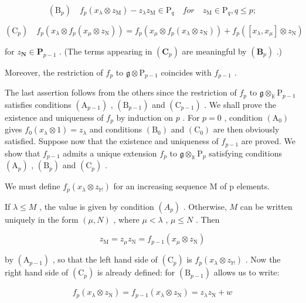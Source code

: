 \[
\left(\mathrm{B} _ {p}\right) \quad f _ {p} \left(x _ {\lambda} \otimes z _ {\mathrm{M}}\right) - z _ {\lambda} z _ {\mathrm{M}} \in \mathrm{P} _ {q} \quad for \quad z _ {\mathrm{M}} \in \mathrm{P} _ {q}, q \leqslant p;
\]

\[
\left(\mathrm{C} _ {p}\right) \quad f _ {p} \left(x _ {\lambda} \otimes f _ {p} \left(x _ {\mu} \otimes z _ {\mathrm{N}}\right)\right) = f _ {p} \left(x _ {\mu} \otimes f _ {p} \left(x _ {\lambda} \otimes z _ {\mathrm{N}}\right)\right) + f _ {p} \left(\left[ x _ {\lambda}, x _ {\mu} \right] \otimes z _ {\mathrm{N}}\right)
\]

for \(z_{\mathbf{N}} \in \mathbf{P}_{p-1}\) . (The terms appearing in \((\mathbf{C}_p)\) are meaningful by \((\mathbf{B}_p)\) .)

Moreover, the restriction of \(f_{p}\) to \(\mathfrak{g} \otimes \mathrm{P}_{p-1}\) coincides with \(f_{p-1}\) .

The last assertion follows from the others since the restriction of \(f_{p}\) to \(\mathfrak{g} \otimes_{\mathbb{K}} \mathrm{P}_{p-1}\) satisfies conditions \((\mathrm{A}_{p-1})\) , \((\mathrm{B}_{p-1})\) and \((\mathrm{C}_{p-1})\) . We shall prove the existence and uniqueness of \(f_{p}\) by induction on \(p\) . For \(p = 0\) , condition \((\mathrm{A}_0)\) gives \(f_0(x_\lambda \otimes 1) = z_\lambda\) and conditions \((\mathrm{B}_0)\) and \((\mathrm{C}_0)\) are then obviously satisfied. Suppose now that the existence and uniqueness of \(f_{p-1}\) are proved. We show that \(f_{p-1}\) admits a unique extension \(f_{p}\) to \(\mathfrak{g} \otimes_{\mathbb{K}} \mathrm{P}_{p}\) satisfying conditions \((\mathrm{A}_{p})\) , \((\mathrm{B}_{p})\) and \((\mathrm{C}_{p})\) .

We must define \(f_{p}(x_{\lambda} \otimes z_{\mathbb{M}})\) for an increasing sequence M of p elements.

If \(\lambda \leqslant M\) , the value is given by condition \((A_p)\) . Otherwise, \(M\) can be written uniquely in the form \((\mu, N)\) , where \(\mu < \lambda\) , \(\mu \leqslant N\) . Then

\[
z _ {\mathrm{M}} = z _ {\mu} z _ {\mathrm{N}} = f _ {p - 1} (x _ {\mu} \otimes z _ {\mathrm{N}})
\]

by \((\mathrm{A}_{p - 1})\) , so that the left hand side of \((\mathrm{C}_p)\) is \(f_{p}(x_{\lambda}\otimes z_{\mathbb{M}})\) . Now the right hand side of \((\mathrm{C}_p)\) is already defined: for \((\mathrm{B}_{p - 1})\) allows us to write:

\[
f _ {p} (x _ {\lambda} \otimes z _ {\mathrm{N}}) = f _ {p - 1} (x _ {\lambda} \otimes z _ {\mathrm{N}}) = z _ {\lambda} z _ {\mathrm{N}} + w
\]

